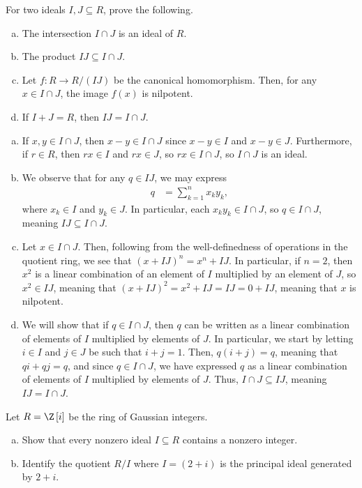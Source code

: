 \documentclass[10pt]{mypackage}
\begin{document}
\RaggedRight
\begin{problem}[Problem 1]
  For two ideals $I,J\subseteq R$, prove the following.
  \begin{enumerate}[(a)]
    \item The intersection $I\cap J$ is an ideal of $R$.
    \item The product $IJ\subseteq I\cap J$.
    \item Let $f\colon R\rightarrow R/(IJ)$ be the canonical homomorphism. Then, for any $x\in I\cap J$, the image $f(x)$ is nilpotent.
    \item If $I + J = R$, then $IJ = I\cap J$.
  \end{enumerate}
\end{problem}
\begin{solution}\hfill
  \begin{enumerate}[(a)]
    \item If $x,y\in I\cap J$, then $x - y\in I\cap J$ since $x-y\in I$ and $x-y\in J$. Furthermore, if $r\in R$, then $rx\in I$ and $rx\in J$, so $rx\in I\cap J$, so $I\cap J$ is an ideal.
    \item We observe that for any $q\in IJ$, we may express
      \begin{align*}
        q &= \sum_{k=1}^{n}x_ky_k,
      \end{align*}
      where $x_k\in I$ and $y_k\in J$. In particular, each $x_ky_k\in I\cap J$, so $q\in I\cap J$, meaning $IJ\subseteq I\cap J$.
    \item Let $x\in I\cap J$. Then, following from the well-definedness of operations in the quotient ring, we see that $\left( x+IJ \right)^{n} = x^{n} + IJ$. In particular, if $n = 2$, then $x^2$ is a linear combination of an element of $I$ multiplied by an element of $J$, so $x^2\in IJ$, meaning that $\left( x + IJ \right)^{2} = x^2 + IJ = IJ = 0 + IJ$, meaning that $x$ is nilpotent.
    \item We will show that if $q\in I\cap J$, then $q$ can be written as a linear combination of elements of $I$ multiplied by elements of $J$. In particular, we start by letting $i\in I$ and $j\in J$ be such that $i + j = 1$. Then, $q\left( i+j \right) = q$, meaning that $qi + qj = q$, and since $q\in I\cap J$, we have expressed $q$ as a linear combination of elements of $I$ multiplied by elements of $J$. Thus, $I\cap J \subseteq IJ$, meaning $IJ = I\cap J$.
  \end{enumerate}
\end{solution}
\begin{problem}[Problem 3]
  Let $R = \Z\left[ i \right]$ be the ring of Gaussian integers.
  \begin{enumerate}[(a)]
    \item Show that every nonzero ideal $I\subseteq R$ contains a nonzero integer.
    \item Identify the quotient $R/I$ where $I = \left( 2+i \right)$ is the principal ideal generated by $2 + i$.
  \end{enumerate}
\end{problem}
\end{document}

